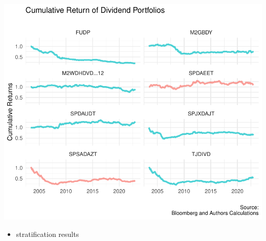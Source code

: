 \documentclass[11pt,preprint, authoryear]{elsarticle}
\numberwithin{equation}{section}
\numberwithin{figure}{section}
\numberwithin{table}{section}
\def\tightlist{} %
\begin{document}
\includegraphics{MuchAdoDivs_files/figure-latex/unnamed-chunk-2-1.pdf}

\begin{itemize}
\tightlist
\item
  stratification results
\end{itemize}
\end{document}
